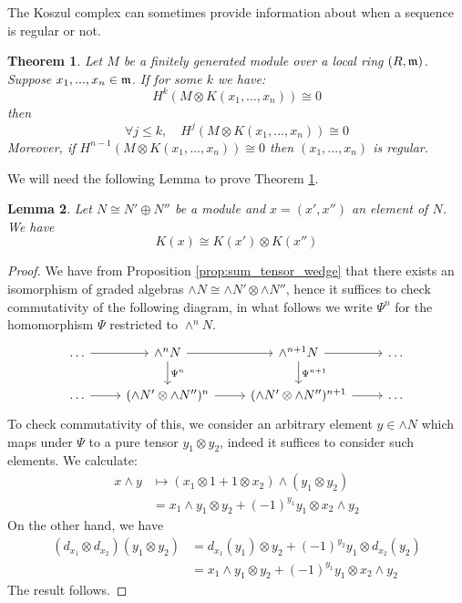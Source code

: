 \documentclass[12pt]{article}
\theoremstyle{plain}
\newtheorem{thm}{Theorem}[subsection] %
\newtheorem{lemma}[thm]{Lemma}
\theoremstyle{definition}
\begin{document}
	The Koszul complex can sometimes provide information about when a sequence is regular or not.
	\begin{thm}\label{thm:exact_reg}
		Let $M$ be a finitely generated module over a local ring $(R,\frak{m})$. Suppose $x_1,...,x_n \in \frak{m}$. If for some $k$ we have:
		\begin{equation}
			H^k(M \otimes K(x_1,...,x_n)) \cong 0
		\end{equation}
		then
		\begin{equation}
			\forall j \leq k,\quad H^j(M \otimes K(x_1,...,x_n)) \cong 0
		\end{equation}
		Moreover, if $H^{n-1}(M \otimes K(x_1,...,x_n)) \cong 0$ then $(x_1,...,x_n)$ is regular.
	\end{thm}
	We will need the following Lemma to prove Theorem \ref{thm:exact_reg}.
	\begin{lemma}\label{lem:sum_tens}
		Let $N \cong N' \oplus N''$ be a module and $x = (x',x'')$ an element of $N$. We have
		\begin{equation}
			K(x) \cong K(x') \otimes K(x'')
		\end{equation}
	\end{lemma}
	\begin{proof}
		We have from Proposition \ref{prop:sum_tensor_wedge} that there exists an isomorphism of graded algebras $\wedge N \cong \wedge N' \otimes \wedge N''$, hence it suffices to check commutativity of the following diagram, in what follows we write $\Psi^n$ for the homomorphism $\Psi$ restricted to $\wedge^n N$.
		\begin{equation}
			\begin{tikzcd}
				\hdots\arrow[r] & \wedge^n N\arrow[r]\arrow[d,"{\Psi^n}"] & \wedge^{n+1} N\arrow[r]\arrow[d,"{\Psi^{n+1}}"] & \hdots\\
				\hdots\arrow[r] & (\wedge N' \otimes \wedge N'')^{n}\arrow[r] & (\wedge N' \otimes \wedge N'')^{n+1}\arrow[r] & \hdots 
			\end{tikzcd}
		\end{equation}
		To check commutativity of this, we consider an arbitrary element $y \in \wedge N$ which maps under $\Psi$ to a pure tensor $y_1 \otimes y_2$, indeed it suffices to consider such elements. We calculate:
		\begin{align*}
			x \wedge y &\longmapsto (x_1 \otimes 1 + 1 \otimes x_2) \wedge (y_1 \otimes y_2)\\
			&= x_1 \wedge y_1 \otimes y_2 + (-1)^{y_1}y_1 \otimes x_2 \wedge y_2
		\end{align*}
		On the other hand, we have
		\begin{align*}
			(d_{x_1} \otimes d_{x_2})(y_1 \otimes y_2) &= d_{x_1}(y_1) \otimes y_2 + (-1)^{y_2}y_1 \otimes d_{x_2}(y_2)\\
			&= x_1 \wedge y_1 \otimes y_2 + (-1)^{y_1}y_1 \otimes x_2 \wedge y_2
		\end{align*}
		The result follows.
	\end{proof}
\end{document}
